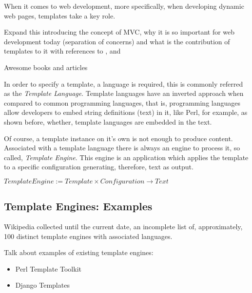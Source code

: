 When it comes to web development, more specifically, when developing dynamic web pages, templates take a key role.

\begin{expand}
    Expand this introducing the concept of MVC,
    why it is so important for web development today (separation of concerns) and what is the contribution of templates to it with references to \cite{Fowler2003PatternsArchitecture},
    \cite{Parr2004EnforcingEngines} and
    \cite{Parr2008TheSeparation}
    
    Awesome books and articles
\end{expand}

In order to specify a template, a language is required, this is commonly referred as the \textit{Template Language}. Template languages have an inverted approach when compared to common programming languages, that is, programming languages allow developers to embed string definitions (text) in it, like Perl, for example, as shown before, whether, template languages are embedded in the text.

Of course, a template instance on it's own is not enough to produce content. Associated with a template language there is always an engine to process it, so called, \textit{Template Engine}. This engine is an application which applies the template to a specific configuration generating, therefore, text as output.

\begin{center}
    $TemplateEngine := Template \times Configuration \rightarrow Text$
\end{center}

\subsection{Template Engines: Examples}

Wikipedia collected \cite{WikipediaComparisonEngines} until the current date, an incomplete list of, approximately, 100 distinct template engines with associated languages.

\begin{expand}
    Talk about examples of existing template engines:
    
    \begin{itemize}
        \item Perl Template Toolkit \cite{Chamberlain2003PerlToolkit}
        \item Django Templates \cite{Newman2008DjangoMore} 
    \end{itemize}
\end{expand}

